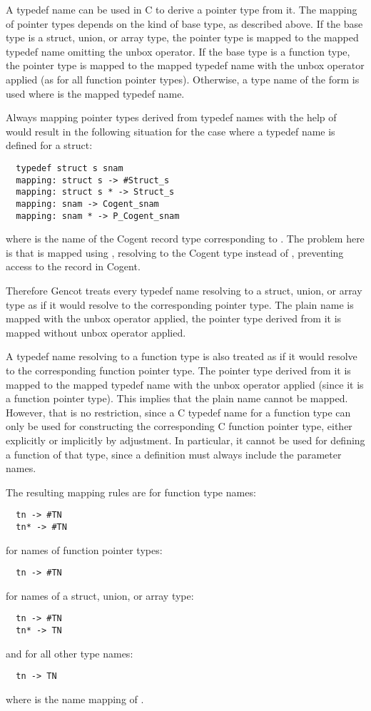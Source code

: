 A typedef name can be used in C to derive a pointer type from it. The mapping of pointer types depends on 
the kind of base type, as described above. If the base type is a struct, union, or array type, 
the pointer type is mapped to the mapped typedef name omitting the unbox operator. If the base type is a function type,
the pointer type is mapped to the mapped typedef name with the unbox 
operator applied (as for all function pointer types). Otherwise, a type name of the form 
 is used where  is the mapped typedef name.

Always mapping pointer types derived from typedef names with the help of  would result in
the following situation for the case where a typedef name is defined for a struct:
\begin{verbatim}
  typedef struct s snam
  mapping: struct s -> #Struct_s
  mapping: struct s * -> Struct_s
  mapping: snam -> Cogent_snam
  mapping: snam * -> P_Cogent_snam
\end{verbatim}
where  is the name of the Cogent record type corresponding to . The problem here
is that  is mapped using , resolving to the Cogent type 
instead of , preventing access to the record in Cogent.

Therefore Gencot treats every typedef name resolving to a struct, union, or array type as if 
it would resolve to the corresponding pointer type. The plain name is mapped with the unbox operator 
applied, the pointer type derived from it is mapped without unbox operator applied. 

A typedef name resolving to a function type is also treated as if it would resolve to the corresponding 
function pointer type. The pointer type derived from it is mapped to the mapped typedef name with the
unbox operator applied (since it is a function pointer type). This implies that the plain name cannot
be mapped. However, that is no restriction, since a C typedef name for a function type can only be used
for constructing the corresponding C function pointer type, either explicitly or implicitly by adjustment.
In particular, it cannot be used for defining a function of that type, since a definition must always 
include the parameter names.

The resulting mapping rules are for function type names:
\begin{verbatim}
  tn -> #TN
  tn* -> #TN
\end{verbatim}
for names of function pointer types:
\begin{verbatim}
  tn -> #TN
\end{verbatim}
for names of a struct, union, or array type:
\begin{verbatim}
  tn -> #TN
  tn* -> TN
\end{verbatim}
and for all other type names:
\begin{verbatim}
  tn -> TN
\end{verbatim}
where  is the name mapping of .

